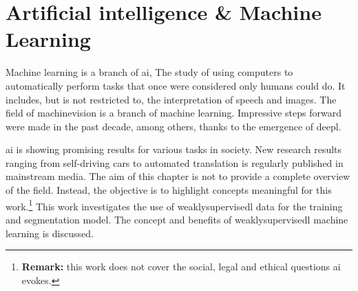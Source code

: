 \chapter{Artificial intelligence \& Machine Learning\label{sec:ai_and_ml}}\thispagestyle{empty}
\par{
    Machine learning is a branch of \Gls{ai}, The study of using computers to automatically perform tasks that once were considered only humans could do. It includes, but is not restricted to, the interpretation of speech and images. 
    The field of \Gls{machinevision} is a branch of machine learning.
    Impressive steps forward were made in the past decade, among others, thanks to the emergence of \Gls{deepl}.
}
\par{
    \Gls{ai} is showing promising results for various tasks in society.
    New research results ranging from self-driving cars to automated translation is regularly published in mainstream media.
    The aim of this chapter is not to provide a complete overview of the field.
    Instead, the objective is to highlight concepts meaningful for this work.\footnote{
        \textbf{Remark:} this work does not cover the social, legal and ethical questions \Gls{ai} evokes.
    }
    This work investigates the use of \Gls{weaklysupervisedl} data for the training and segmentation model. 
    The concept and benefits of \Gls{weaklysupervisedl} machine learning is discussed.
}

